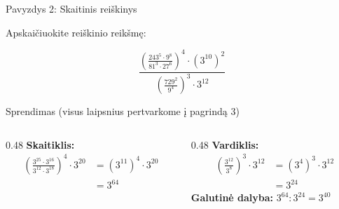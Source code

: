 \documentclass[aspectratio=169,10pt]{beamer}
\begin{document}
\begin{frame}{Pavyzdys 2: Skaitinis reiškinys}

    \begin{example}

        Apskaičiuokite reiškinio reikšmę:

        \[
        \frac{
        \left(
        \frac{243^5\cdot9^8}{81^3\cdot27^6}
        \right)^4
        \cdot
        \left(3^{10}\right)^2
        }{
        \left(
        \frac{729^2}{9^4}
        \right)^3
        \cdot
        3^{12}
        }
        \]

    \end{example}

    \begin{block}{Sprendimas (visus laipsnius pertvarkome į pagrindą $3$)}
        \small
        \begin{columns}[T,onlytextwidth]
            \begin{column}{0.48\textwidth}
                \vspace{0.4em}
                \textbf{Skaitiklis:}
                \[
                    \begin{aligned}
                    \left(\frac{3^{25}\cdot3^{16}}{3^{12}\cdot3^{18}}\right)^4
                    \cdot3^{20}
                    &=(3^{11})^4\cdot3^{20}\\
                    &=3^{64}
                    \end{aligned}
                \]
            \end{column}
            \begin{column}{0.48\textwidth}
                \vspace{0.4em}
                \textbf{Vardiklis:}
                \[
                    \begin{aligned}
                    \left(\frac{3^{12}}{3^8}\right)^3\cdot3^{12}
                    &=(3^4)^3\cdot3^{12}\\
                    &=3^{24}
                    \end{aligned}
                \]
                \textbf{Galutinė dalyba:} $3^{64}:3^{24}=3^{40}$
            \end{column}
        \end{columns}
    \end{block}

\end{frame}
\end{document}
